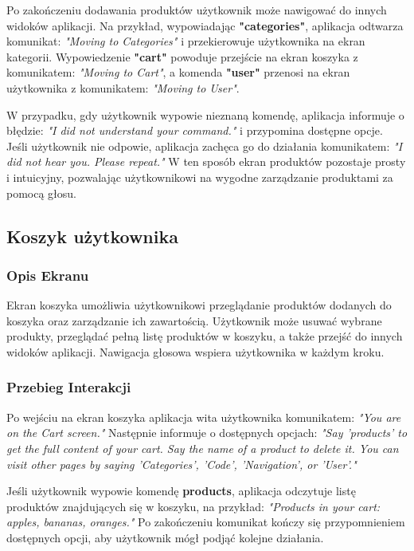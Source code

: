 Po zakończeniu dodawania produktów użytkownik może nawigować do innych widoków aplikacji. Na przykład, wypowiadając \textbf{"categories"}, aplikacja odtwarza komunikat: \textit{"Moving to Categories"} i przekierowuje użytkownika na ekran kategorii. Wypowiedzenie \textbf{"cart"} powoduje przejście na ekran koszyka z komunikatem: \textit{"Moving to Cart"}, a komenda \textbf{"user"} przenosi na ekran użytkownika z komunikatem: \textit{"Moving to User"}.

W przypadku, gdy użytkownik wypowie nieznaną komendę, aplikacja informuje o błędzie: \textit{"I did not understand your command."} i przypomina dostępne opcje. Jeśli użytkownik nie odpowie, aplikacja zachęca go do działania komunikatem: \textit{"I did not hear you. Please repeat."} W ten sposób ekran produktów pozostaje prosty i intuicyjny, pozwalając użytkownikowi na wygodne zarządzanie produktami za pomocą głosu.

\subsection{Koszyk użytkownika}

\subsubsection{Opis Ekranu}
Ekran koszyka umożliwia użytkownikowi przeglądanie produktów dodanych do koszyka oraz zarządzanie ich zawartością. Użytkownik może usuwać wybrane produkty, przeglądać pełną listę produktów w koszyku, a także przejść do innych widoków aplikacji. Nawigacja głosowa wspiera użytkownika w każdym kroku.

\subsubsection{Przebieg Interakcji}
Po wejściu na ekran koszyka aplikacja wita użytkownika komunikatem: \textit{"You are on the Cart screen."} Następnie informuje o dostępnych opcjach: \textit{"Say 'products' to get the full content of your cart. Say the name of a product to delete it. You can visit other pages by saying 'Categories', 'Code', 'Navigation', or 'User'."}

Jeśli użytkownik wypowie komendę \textbf{products}, aplikacja odczytuje listę produktów znajdujących się w koszyku, na przykład: \textit{"Products in your cart: apples, bananas, oranges."} Po zakończeniu komunikat kończy się przypomnieniem dostępnych opcji, aby użytkownik mógł podjąć kolejne działania.

